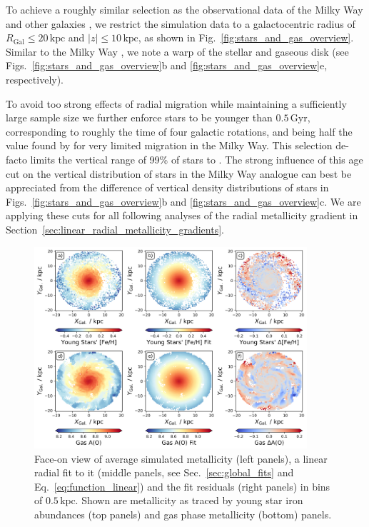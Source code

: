 \documentclass[twocolumn,apj,numberedappendix,appendixfloats]{openjournal}
\newcommand{\nihaoAGEmax}{$0.5\,\mathrm{Gyr}$}
\begin{document}
\begin{CJK*}{UTF8}{gbsn}
To achieve a roughly similar selection as the observational data of the Milky Way \citep{Genovali2014} and other galaxies \citep[e.g.][]{Chen2023}, we restrict the simulation data to a galactocentric radius of $R_\mathrm{Gal} \leq 20\,\mathrm{kpc}$ and $\vert z \vert \leq 10\,\mathrm{kpc}$, as shown in Fig.~\ref{fig:stars_and_gas_overview}. Similar to the Milky Way \citep{Poggio2018, Lemasle2022}, we note a warp of the stellar and gaseous disk (see Figs.~\ref{fig:stars_and_gas_overview}b and \ref{fig:stars_and_gas_overview}e, respectively).

To avoid too strong effects of radial migration \citep{Binney2008, Frankel2018, Grand2016, Minchev2018} while maintaining a sufficiently large sample size we further enforce stars to be younger than \nihaoAGEmax, corresponding to roughly the time of four galactic rotations, and being half the value found by \citet{Minchev2018} for very limited migration in the Milky Way. This selection de-facto limits the vertical range of 99\% of stars to . The strong influence of this age cut on the vertical distribution of stars in the Milky Way analogue can best be appreciated from the difference of vertical density distributions of stars in Figs.~\ref{fig:stars_and_gas_overview}b and \ref{fig:stars_and_gas_overview}c. We are applying these cuts for all following analyses of the radial metallicity gradient in Section~\ref{sec:linear_radial_metallicity_gradients}.

\begin{figure}
    \centering
    \includegraphics[width=0.9\textwidth]{figures/stars_and_gas_2d_view.png}
    \caption{Face-on view of average simulated metallicity (left panels), a linear radial fit to it (middle panels, see Sec.~\ref{sec:global_fits} and Eq.~\ref{eq:function_linear}) and the fit residuals (right panels) in bins of $0.5\,\mathrm{kpc}$. Shown are metallicity as traced by young star iron abundances (top panels) and gas phase metallicity (bottom) panels.}
    \label{fig:stars_and_gas_2d_view}
\end{figure}


\end{CJK*}
\end{document}
